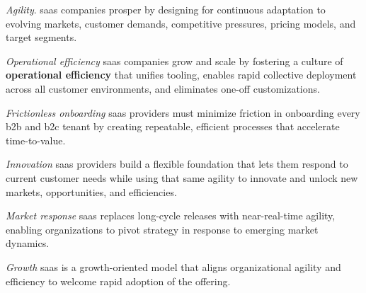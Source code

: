\documentclass[11pt, a4paper, oneside, listof=totoc]{scrartcl}
\begin{document}
            \begin{enumerate}[label={[\arabic*]:},
                    ref=Challenge~\arabic*,
                    leftmargin=*,
                    itemsep=0.6\baselineskip]

                    \item\label{chal:saasAgility}
                        \textit{Agility}.
                        \gls{saas} companies prosper by designing for continuous adaptation to
                        evolving markets, customer demands, competitive pressures, pricing models,
                        and target segments.

                    \item\label{chal:saasOperationalEfficiency}
                        \textit{Operational efficiency}
                        \gls{saas} companies grow and scale by fostering a culture of
                        \textbf{operational efficiency} that unifies tooling, enables rapid
                        collective deployment across all customer environments, and eliminates
                        one-off customizations.

                    \item\label{chal:saasFrictionlessOnboarding}
                        \textit{Frictionless onboarding}
                        \gls{saas} providers must minimize friction in onboarding every \gls{b2b}
                        and \gls{b2c} tenant by creating repeatable, efficient processes that
                        accelerate time-to-value.

                    \item\label{chal:saasInnovation}
                        \textit{Innovation}
                        \gls{saas} providers build a flexible foundation that lets them respond to
                        current customer needs while using that same agility to innovate and unlock
                        new markets, opportunities, and efficiencies.

                    \item\label{chal:saasMarketResponse}
                        \textit{Market response}
                        \gls{saas} replaces long-cycle releases with near-real-time agility,
                        enabling organizations to pivot strategy in response to emerging market
                        dynamics.

                    \item\label{chal:saasGrowth}
                        \textit{Growth}
                        \gls{saas} is a growth-oriented model that aligns organizational agility and
                        efficiency to welcome rapid adoption of the offering. 

            \end{enumerate}
\end{document}

